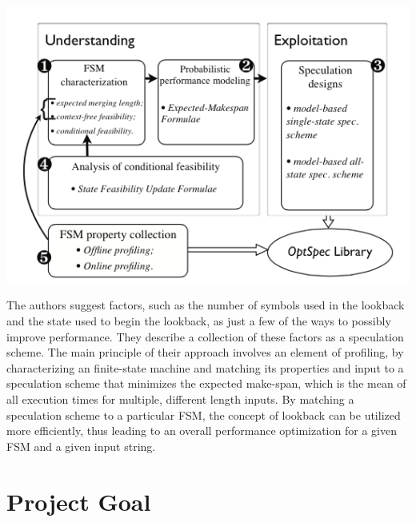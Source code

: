 \documentclass[11pt]{sigplanconf}
\newenvironment{Figure} %
  {\par\medskip\noindent\minipage{\linewidth}}
  {\endminipage\par\medskip}
\begin{document}
\begin{Figure}
\centering
\includegraphics[width=\linewidth]{lookback_profiling_overview.png}
\label{fig:Lookback Profiling}
\end{Figure}

The authors suggest factors, such as the number of symbols used in the lookback and the state used to begin the lookback, as just a few of the ways to possibly improve performance. They describe a collection of these factors as a speculation scheme. The main principle of their approach involves an element of profiling, by characterizing an finite-state machine and matching its properties and input to a speculation scheme that minimizes the expected make-span, which is the mean of all execution times for multiple, different length inputs. By matching a speculation scheme to a particular FSM, the concept of lookback can be utilized more efficiently, thus leading to an overall performance optimization for a given FSM and a given input string.

\section{Project Goal}
\end{document}
